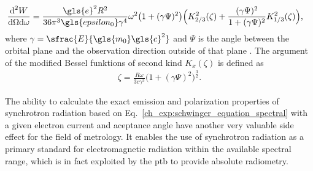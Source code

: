 \begin{align}
 \frac{\text{d}^2 W}{\text{d} \Omega \text{d} \omega} &= \frac{\gls{e}^2 R^2}{36 \pi^3 \gls{epsilon_0} \gamma^4} \omega^2 \big(1+ (\gamma \Psi)^2\big)\Big( K_{2/3}^2(\zeta) + \frac{(\gamma \Psi)^2}{1 + (\gamma \Psi)^2} K_{1/3}^2(\zeta)\Big) \text{,} \label{ch_exp:schwinger_equation_spectral}
\end{align}
where $\gamma = \sfrac{E}{\gls{m_0} \gls{c}^2}$ and $\Psi$ is the angle between the orbital plane and the observation direction outside of that plane \cite{schwinger_classical_1949}. The argument of the modified Bessel funktions of second kind $K_{x}(\zeta)$ is defined as
\begin{align}
 \zeta = \frac{R \omega}{3 c \gamma^3} \big(1 + (\gamma \Psi)^2\big)^\frac{3}{2} \text{.}
\end{align}


The ability to calculate the exact emission and polarization properties of synchrotron radiation based on Eq.~\eqref{ch_exp:schwinger_equation_spectral} with a given electron current and aceptance angle have another very valuable side effect for the field of metrology. It enables the use of synchrotron radiation as a primary standard for electromagnetic radiation within the available spectral range, which is in fact exploited by the \gls{ptb} \cite{thornagel_electron_2001} to provide absolute radiometry.

